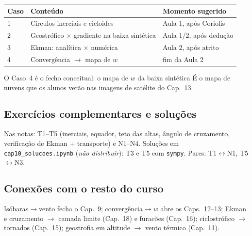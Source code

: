 \begin{center}
\begin{tabular}{lll}
\hline
Caso & Conteúdo & Momento sugerido \\
\hline
1 & Círculos inerciais e cicloides & Aula 1, após Coriolis \\
2 & Geostrófico × gradiente na baixa sintética & Aula 1/2, após dedução \\
3 & Ekman: analítica × numérica & Aula 2, após atrito \\
4 & Convergência $\to$ mapa de $w$ & fim da Aula 2 \\
\hline
\end{tabular}
\end{center}

O Caso~4 é o fecho conceitual: o mapa de $w$ da baixa sintética É o mapa
de nuvens que os alunos verão nas imagens de satélite do Cap.~13.

\subsection*{Exercícios complementares e soluções}

Nas notas: T1--T5 (inerciais, equador, teto das altas, ângulo de
cruzamento, verificação de Ekman + transporte) e N1--N4. Soluções em
\texttt{cap10\_solucoes.ipynb} (\emph{não distribuir}): T3 e T5 com
\texttt{sympy}. Pares: T1$\leftrightarrow$N1, T5$\leftrightarrow$N3.

\subsection*{Conexões com o resto do curso}

Isóbaras$\to$vento fecha o Cap.~9; convergência$\to w$ abre os
Caps.~12--13; Ekman e cruzamento $\to$ camada limite (Cap.~18) e furacões
(Cap.~16); ciclostrófico $\to$ tornados (Cap.~15); geostrofia em altitude
$\to$ vento térmico (Cap.~11).
